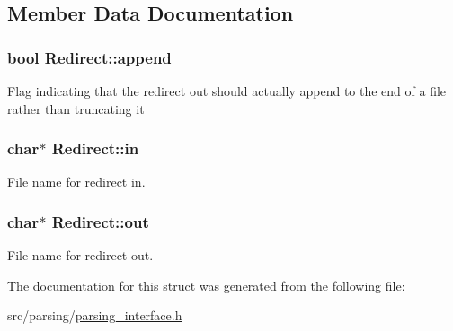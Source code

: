 \subsection{Member Data Documentation}
\hypertarget{structRedirect_aea1d3bd9c3b6e1dbf1661b616df9818e}{
\subsubsection[{append}]{\setlength{\rightskip}{0pt plus 5cm}bool Redirect\-::append}}\label{structRedirect_aea1d3bd9c3b6e1dbf1661b616df9818e}
Flag indicating that the redirect out should actually append to the end of a file rather than truncating it \hypertarget{structRedirect_ab0e76f7e58a26d52216c8c4bfc9c2e83}{
\subsubsection[{in}]{\setlength{\rightskip}{0pt plus 5cm}char$\ast$ Redirect\-::in}}\label{structRedirect_ab0e76f7e58a26d52216c8c4bfc9c2e83}
File name for redirect in. \hypertarget{structRedirect_a9d5efc0a96275e13eba0e71450771952}{
\subsubsection[{out}]{\setlength{\rightskip}{0pt plus 5cm}char$\ast$ Redirect\-::out}}\label{structRedirect_a9d5efc0a96275e13eba0e71450771952}
File name for redirect out. 

The documentation for this struct was generated from the following file\-:\begin{DoxyCompactItemize}
\item 
src/parsing/\hyperlink{parsing__interface_8h}{parsing\-\_\-interface.\-h}\end{DoxyCompactItemize}
